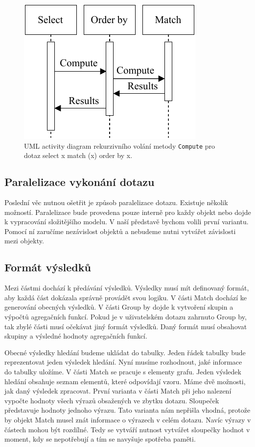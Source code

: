 \begin{figure}[!htp]
\includegraphics{../img/diaQueryObjectsCall.pdf}\centering
\caption{UML activity diagram rekurzivního volání metody \texttt{Compute} pro dotaz select x match (x) order by x.}
\label{figure.diaQueryObjectsCall}
\end{figure}

\subsection{Paralelizace vykonání dotazu}

Poslední věc nutnou ošetřit je způsob paralelizace dotazu.
Existuje několik možností.
Paralelizace bude provedena pouze interně pro každy objekt nebo dojde k vypracování složitějšího modelu.
V naší představě bychom volili první variantu.
Pomocí ní zaručíme nezávislost objektů a nebudeme nutni vytvářet závislosti mezi objekty.

\subsection{Formát výsledků} \label{anal.tables}

Mezi částmi dochází k předávání výsledků.
Výsledky musí mít definovaný formát, aby každá část dokázala správně provádět svou logiku.
V části Match dochází ke generování obecných výsledků.
V části Group by dojde k vytvoření skupin a výpočtů agregačních funkcí.
Pokud je v uživatelském dotazu zahrnuto Group by, tak zbylé části musí očekávat jiný formát výsledků.
Daný formát musí obsahovat skupiny a výsledné hodnoty agregačních funkcí.

Obecné výsledky hledání budeme ukládat do tabulky.
Jeden řádek tabulky bude reprezentovat jeden výsledek hledání.
Nyní musíme rozhodnout, jaké informace do tabulky uložíme.
V části Match se pracuje s elementy grafu.
Jeden výsledek hledání obsahuje seznam elementů, které odpovídají vzoru.
Máme dvě možnosti, jak daný výsledek zpracovat.
První varianta v části Match při jeho nalezení vypočte hodnoty všech výrazů obsažených ve zbytku dotazu.
Sloupeček představuje hodnoty jednoho výrazu.
Tato varianta nám nepřišla vhodná, protože by objekt Match musel znát informace o výrazech v celém dotazu.
Navíc výrazy v částech mohou být rozdílné.
Tedy se vytváří nutnost vytvářet sloupečky hodnot v moment, kdy se nepotřebují a tím se navyšuje spotřeba paměti.

